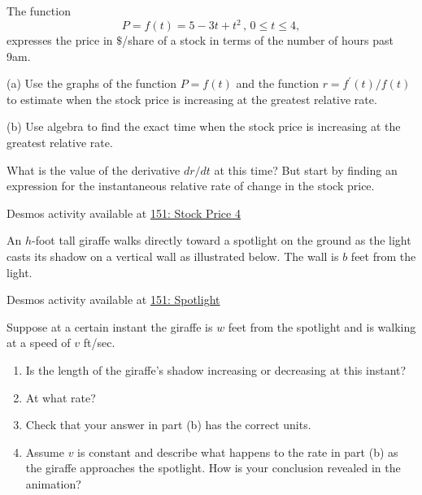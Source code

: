 \documentclass{ximera}
\begin{document}
\begin{exercise}  \label{EEdvbrttyer}
The function 
\[
      P = f(t) = 5 -3t + t^2 \, , \, 0\leq t \leq 4 , 
\]
expresses the price in $\$$/share of a stock in terms of the number of hours past 9am.

(a) Use the graphs of the function $P=f(t)$ and the function $r=f^\prime(t)/f(t)$  to estimate when the stock price is increasing at the greatest relative rate.

(b) Use algebra to find the exact time when the stock price is increasing at the greatest relative rate.
\begin{hint}
What is the value of the derivative $dr/dt$ at this time? But start by finding an expression for the instantaneous relative rate of change in the stock price.
\end{hint}


\begin{onlineOnly}
    \begin{center}
\end{center}
\end{onlineOnly}

Desmos activity available at \href{https://www.desmos.com/calculator/xuupp3srqv}{151: Stock Price 4}

\end{exercise}


\begin{exercise}  \label{EEdgvbfghjjjyu}

An $h$-foot tall giraffe walks directly toward a spotlight on the ground as the light casts its shadow on a vertical wall as illustrated below. The wall is $b$ feet from the light.

\begin{onlineOnly}
    \begin{center}
\end{center}
\end{onlineOnly}

Desmos activity available at \href{https://www.desmos.com/calculator/2eiyjjpu9n}{151: Spotlight}

Suppose at a certain instant the giraffe is $w$ feet from the spotlight and is walking at a speed of $v$ ft/sec. 

\begin{enumerate}

\item Is the length of the giraffe's shadow increasing or decreasing at this instant? 

\item At what rate? 

\item Check that your answer in part (b) has the correct units.

\item Assume $v$ is constant and describe what happens to the rate in part (b) as the giraffe approaches the spotlight. How is your conclusion revealed in the animation?

\end{enumerate}

\end{exercise}
\end{document}
